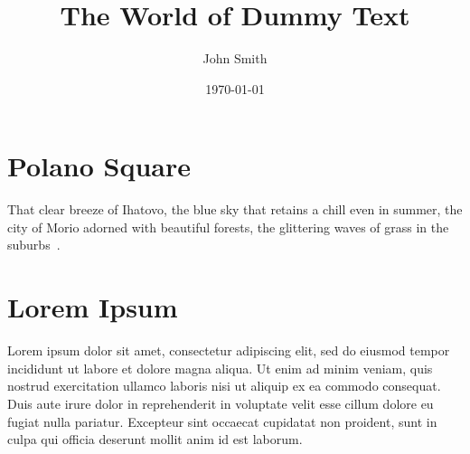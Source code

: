 \documentclass[twocolumn]{article}
\begin{document}
\title{The World of Dummy Text}
\author{John Smith}
\date{\today}
\maketitle

\section{Polano Square}

That clear breeze of Ihatovo, the blue sky that retains a chill even in summer, the city of Morio adorned with beautiful forests, the glittering waves of grass in the suburbs~\cite{miyazawa1934polano}.

\section{Lorem Ipsum}

Lorem ipsum dolor sit amet, consectetur adipiscing elit, sed do eiusmod tempor incididunt ut labore et dolore magna aliqua.
Ut enim ad minim veniam, quis nostrud exercitation ullamco laboris nisi ut aliquip ex ea commodo consequat.
Duis aute irure dolor in reprehenderit in voluptate velit esse cillum dolore eu fugiat nulla pariatur.
Excepteur sint occaecat cupidatat non proident, sunt in culpa qui officia deserunt mollit anim id est laborum.



\end{document}
